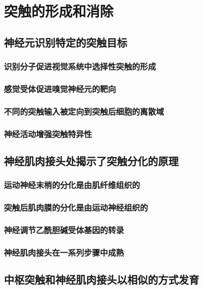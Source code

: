 \chapter{突触的形成和消除}

\section{神经元识别特定的突触目标}
\subsection{识别分子促进视觉系统中选择性突触的形成}
\subsection{感觉受体促进嗅觉神经元的靶向}
\subsection{不同的突触输入被定向到突触后细胞的离散域}
\subsection{神经活动增强突触特异性}

\section{神经肌肉接头处揭示了突触分化的原理}
\subsection{运动神经末梢的分化是由肌纤维组织的}
\subsection{突触后肌肉膜的分化是由运动神经组织的}
\subsection{神经调节乙酰胆碱受体基因的转录}
\subsection{神经肌肉接头在一系列步骤中成熟}

\section{中枢突触和神经肌肉接头以相似的方式发育}
